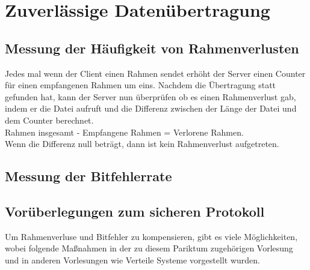 \documentclass{scrartcl}
\begin{document}
\section[Versuch 2 Zuverlässige Datenübertragung]{Zuverlässige Datenübertragung}
  \subsection[Aufgabe 2 Messung der Häufigkeit von Rahmenverlusten]{Messung der Häufigkeit von Rahmenverlusten}
  
  Jedes mal wenn der Client einen Rahmen sendet erhöht der Server einen Counter für einen empfangenen Rahmen um eins. Nachdem die Übertragung statt gefunden hat, kann der Server nun überprüfen ob es einen Rahmenverlust gab, indem er die Datei aufruft und die Differenz zwischen der Länge der Datei und dem Counter berechnet. \\
Rahmen insgesamt - Empfangene  Rahmen = Verlorene Rahmen.\\
Wenn die Differenz null beträgt, dann ist kein Rahmenverlust aufgetreten.

  \subsection[Aufgabe 3 Messung der Bitfehlerrate]{Messung der Bitfehlerrate}
 
  \subsection[Aufgabe 4 Vorüberlegungen zum sicheren Protokoll]{Vorüberlegungen zum sicheren Protokoll}
  
  Um Rahmenverluse und Bitfehler zu kompensieren, gibt es viele Möglichkeiten, wobei folgende Maßnahmen in der zu diesem Pariktum zugehörigen Vorlesung und in anderen Vorlesungen wie Verteile Systeme vorgestellt wurden.
  
\end{document}
